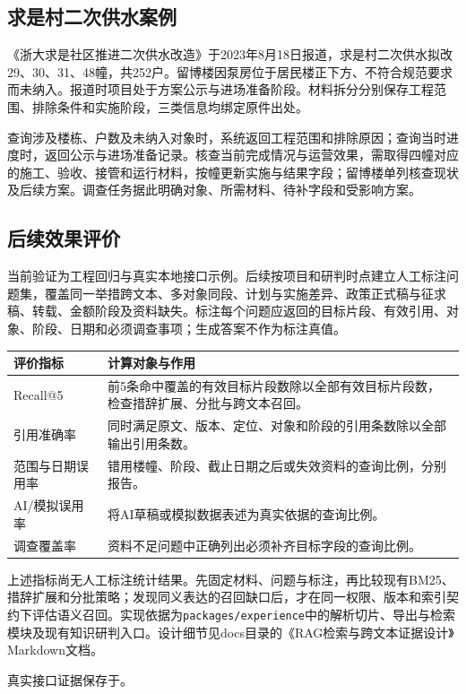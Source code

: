 \subsection{求是村二次供水案例}

《浙大求是社区推进二次供水改造》于2023年8月18日报道，求是村二次供水拟改29、30、31、48幢，共252户。留博楼因泵房位于居民楼正下方、不符合规范要求而未纳入。报道时项目处于方案公示与进场准备阶段。材料拆分分别保存工程范围、排除条件和实施阶段，三类信息均绑定原件出处。

查询涉及楼栋、户数及未纳入对象时，系统返回工程范围和排除原因；查询当时进度时，返回公示与进场准备记录。核查当前完成情况与运营效果，需取得四幢对应的施工、验收、接管和运行材料，按幢更新实施与结果字段；留博楼单列核查现状及后续方案。调查任务据此明确对象、所需材料、待补字段和受影响方案。

\subsection{后续效果评价}

当前验证为工程回归与真实本地接口示例。后续按项目和研判时点建立人工标注问题集，覆盖同一举措跨文本、多对象同段、计划与实施差异、政策正式稿与征求稿、转载、金额阶段及资料缺失。标注每个问题应返回的目标片段、有效引用、对象、阶段、日期和必须调查事项；生成答案不作为标注真值。

\begin{longtable}{L{29mm}L{126mm}}
\toprule
评价指标 & 计算对象与作用\\
\midrule
\endhead
Recall@5 & 前5条命中覆盖的有效目标片段数除以全部有效目标片段数，检查措辞扩展、分批与跨文本召回。\\
引用准确率 & 同时满足原文、版本、定位、对象和阶段的引用条数除以全部输出引用条数。\\
范围与日期误用率 & 错用楼幢、阶段、截止日期之后或失效资料的查询比例，分别报告。\\
AI/模拟误用率 & 将AI草稿或模拟数据表述为真实依据的查询比例。\\
调查覆盖率 & 资料不足问题中正确列出必须补齐目标字段的查询比例。\\
\bottomrule
\end{longtable}

上述指标尚无人工标注统计结果。先固定材料、问题与标注，再比较现有BM25、措辞扩展和分批策略；发现同义表达的召回缺口后，才在同一权限、版本和索引契约下评估语义召回。实现依据为\texttt{packages/experience}中的解析切片、导出与检索模块及现有知识研判入口。设计细节见docs目录的《RAG检索与跨文本证据设计》Markdown文档。

真实接口证据保存于。
